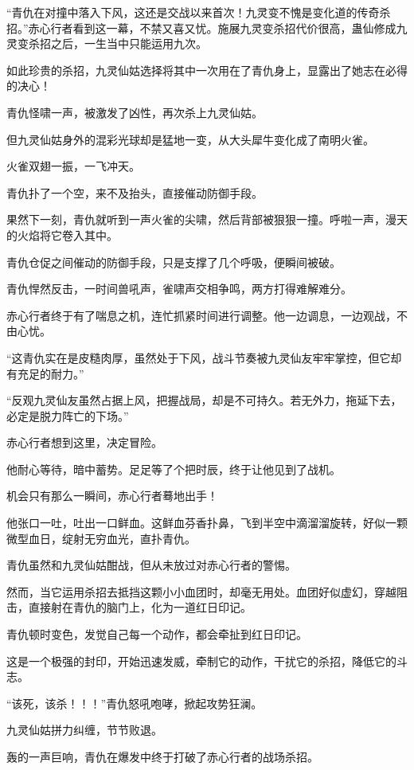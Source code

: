 \begin{this_body}
“青仇在对撞中落入下风，这还是交战以来首次！九灵变不愧是变化道的传奇杀招。”赤心行者看到这一幕，不禁又喜又忧。施展九灵变杀招代价很高，蛊仙修成九灵变杀招之后，一生当中只能运用九次。

如此珍贵的杀招，九灵仙姑选择将其中一次用在了青仇身上，显露出了她志在必得的决心！

青仇怪啸一声，被激发了凶性，再次杀上九灵仙姑。

但九灵仙姑身外的混彩光球却是猛地一变，从大头犀牛变化成了南明火雀。

火雀双翅一振，一飞冲天。

青仇扑了一个空，来不及抬头，直接催动防御手段。

果然下一刻，青仇就听到一声火雀的尖啸，然后背部被狠狠一撞。呼啦一声，漫天的火焰将它卷入其中。

青仇仓促之间催动的防御手段，只是支撑了几个呼吸，便瞬间被破。

青仇悍然反击，一时间兽吼声，雀啸声交相争鸣，两方打得难解难分。

赤心行者终于有了喘息之机，连忙抓紧时间进行调整。他一边调息，一边观战，不由心忧。

“这青仇实在是皮糙肉厚，虽然处于下风，战斗节奏被九灵仙友牢牢掌控，但它却有充足的耐力。”

“反观九灵仙友虽然占据上风，把握战局，却是不可持久。若无外力，拖延下去，必定是脱力阵亡的下场。”

赤心行者想到这里，决定冒险。

他耐心等待，暗中蓄势。足足等了个把时辰，终于让他见到了战机。

机会只有那么一瞬间，赤心行者蓦地出手！

他张口一吐，吐出一口鲜血。这鲜血芬香扑鼻，飞到半空中滴溜溜旋转，好似一颗微型血日，绽射无穷血光，直扑青仇。

青仇虽然和九灵仙姑酣战，但从未放过对赤心行者的警惕。

然而，当它运用杀招去抵挡这颗小小血团时，却毫无用处。血团好似虚幻，穿越阻击，直接射在青仇的脑门上，化为一道红日印记。

青仇顿时变色，发觉自己每一个动作，都会牵扯到红日印记。

这是一个极强的封印，开始迅速发威，牵制它的动作，干扰它的杀招，降低它的斗志。

“该死，该杀！！！”青仇怒吼咆哮，掀起攻势狂澜。

九灵仙姑拼力纠缠，节节败退。

轰的一声巨响，青仇在爆发中终于打破了赤心行者的战场杀招。


\end{this_body}
